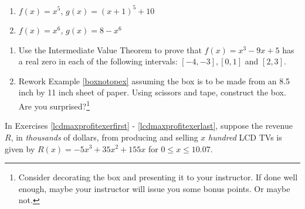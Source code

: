 \documentclass{ximera}
\begin{document}
\begin{multicols}{2}
\begin{enumerate}
\setcounter{enumi}{\value{HW}}

\item $f(x) = x^5$, $g(x) = (x+1)^5+10$
\item $f(x) = x^6$, $g(x) = 8-x^6$ \label{polytranslast}

\setcounter{HW}{\value{enumi}}
\end{enumerate}
\end{multicols}



\begin{enumerate}
\setcounter{enumi}{\value{HW}}

\item Use the Intermediate Value Theorem to prove that $f(x) = x^{3} - 9x + 5$ has a real zero in each of the following intervals: $[-4, -3], [0, 1]$ and $[2, 3]$.

\item  Rework Example \ref{boxnotopex} assuming the box is to be made from an 8.5 inch by 11 inch sheet of paper. Using scissors and tape, construct the box.  Are you surprised?\footnote{Consider decorating the box and presenting it to your instructor. If done well enough, maybe your instructor will issue you some bonus points.  Or maybe not.}

\setcounter{HW}{\value{enumi}}
\end{enumerate}


\label{LCDmaxprofit} 

In Exercises \ref{lcdmaxprofitexerfirst} - \ref{lcdmaxprofitexerlast}, suppose the revenue $R$, in \textit{thousands} of dollars, from producing and selling $x$ \textit{hundred} LCD TVs is given by $R(x) = -5x^3+35x^2+155x$ for $0 \leq x \leq 10.07$.
\end{document}

